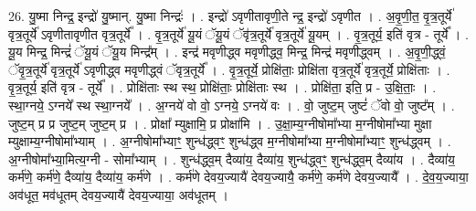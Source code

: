 \documentclass[17pt]{extarticle}
\begin{document}
26. यु॒ष्मा निन्द्र॒ इन्द्रो॑ यु॒ष्मान्. यु॒ष्मा निन्द्रः॑ । . इन्द्रो॑ ऽवृणीतावृणी॒ते न्द्र॒ इन्द्रो॑ ऽवृणीत । . अ॒वृ॒णी॒त॒ वृ॒त्र॒तूर्ये॑ वृत्र॒तूर्ये॑ ऽवृणीतावृणीत वृत्र॒तूर्ये᳚ । . वृ॒त्र॒तूर्ये॑ यू॒यं ॅयू॒यं ॅवृ॑त्र॒तूर्ये॑ वृत्र॒तूर्ये॑ यू॒यम् । . वृ॒त्र॒तूर्य॒ इति॑ वृत्र - तूर्ये᳚ । . यू॒य मिन्द्र॒ मिन्द्रं॑ ॅयू॒यं ॅयू॒य मिन्द्र᳚म् । . इन्द्र॑ मवृणीद्ध्व मवृणीद्ध्व॒ मिन्द्र॒ मिन्द्र॑ मवृणीद्ध्वम् । . अ॒वृ॒णी॒द्ध्वं॒ ॅवृ॒त्र॒तूर्ये॑ वृत्र॒तूर्ये॑ ऽवृणीद्ध्व मवृणीद्ध्वं ॅवृत्र॒तूर्ये᳚ । . वृ॒त्र॒तूर्ये॒ प्रोक्षि॑ताः॒ प्रोक्षि॑ता वृत्र॒तूर्ये॑ वृत्र॒तूर्ये॒ प्रोक्षि॑ताः । . वृ॒त्र॒तूर्य॒ इति॑ वृत्र - तूर्ये᳚ । . प्रोक्षि॑ताः स्थ स्थ॒ प्रोक्षि॑ताः॒ प्रोक्षि॑ताः स्थ । . प्रोक्षि॑ता॒ इति॒ प्र - उ॒क्षि॒ताः॒ । . स्था॒ग्नये॒ ऽग्नये᳚ स्थ स्था॒ग्नये᳚ । . अ॒ग्नये॑ वो वो॒ ऽग्नये॒ ऽग्नये॑ वः । . वो॒ जुष्ट॒म् जुष्टं॑ ॅवो वो॒ जुष्ट᳚म् । . जुष्ट॒म् प्र प्र जुष्ट॒म् जुष्ट॒म् प्र । . प्रोक्षा᳚ म्युक्षामि॒ प्र प्रोक्षा॑मि । . उ॒क्षा॒म्य॒ग्नीषोमा᳚भ्या म॒ग्नीषोमा᳚भ्या मुक्षा म्युक्षाम्य॒ग्नीषोमा᳚भ्याम् । . अ॒ग्नीषोमा᳚भ्याꣳ॒॒ शुन्ध॑द्ध्वꣳ॒॒ शुन्ध॑द्ध्व म॒ग्नीषोमा᳚भ्या म॒ग्नीषोमा᳚भ्याꣳ॒॒ शुन्ध॑द्ध्वम् । . अ॒ग्नीषोमा᳚भ्या॒मित्य॒ग्नी - सोमा᳚भ्याम् । . शुन्ध॑द्ध्व॒म् दैव्या॑य॒ दैव्या॑य॒ शुन्ध॑द्ध्वꣳ॒॒ शुन्ध॑द्ध्व॒म् दैव्या॑य । . दैव्या॑य॒ कर्म॑णे॒ कर्म॑णे॒ दैव्या॑य॒ दैव्या॑य॒ कर्म॑णे । . कर्म॑णे देवय॒ज्यायै॑ देवय॒ज्यायै॒ कर्म॑णे॒ कर्म॑णे देवय॒ज्यायै᳚ । . दे॒व॒य॒ज्याया॒ अव॑धूत॒ मव॑धूतम् देवय॒ज्यायै॑ देवय॒ज्याया॒ अव॑धूतम् । \newline
\end{document}
